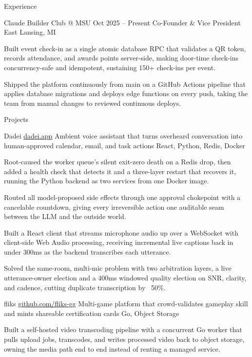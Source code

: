 \documentclass[
	11pt
]{../../../template}
\begin{document}
\begin{rSection}{E}{xperience}
		\begin{rSectionEntry}
			{Claude Builder Club @ MSU}
			{Oct 2025 -- Present}
			{Co-Founder \& Vice President}
			{}
			{East Lansing, MI}

			\item Built event check-in as a single atomic database RPC that validates a QR token, records attendance, and awards points server-side, making door-time check-ins concurrency-safe and idempotent, sustaining 150+ check-ins per event.
			\item Shipped the platform continuously from main on a GitHub Actions pipeline that applies database migrations and deploys edge functions on every push, taking the team from manual changes to reviewed continuous deploys.
		\end{rSectionEntry}
	\end{rSection}

	\begin{rSection}{P}{rojects}
		\begin{rSectionEntry}
			{Dadei}
			{\href{https://dadei.app}{dadei.app}}
			{Ambient voice assistant that turns overheard conversation into human-approved calendar, email, and task actions}
			{React, Python, Redis, Docker}
			{}

			\item Root-caused the worker queue's silent exit-zero death on a Redis drop, then added a health check that detects it and a three-layer restart that recovers it, running the Python backend as two services from one Docker image.
			\item Routed all model-proposed side effects through one approval chokepoint with a cancelable countdown, giving every irreversible action one auditable seam between the LLM and the outside world.
			\item Built a React client that streams microphone audio up over a WebSocket with client-side Web Audio processing, receiving incremental live captions back in under 300ms as the backend transcribes each utterance.
			\item Solved the same-room, multi-mic problem with two arbitration layers, a live utterance-owner election and a 400ms windowed quality election on SNR, clarity, and cadence, cutting duplicate transcription by ~50\%.
		\end{rSectionEntry}

		\begin{rSectionEntry}
			{fliks}
			{\href{https://github.com/fliks-gg}{github.com/fliks-gg}}
			{Multi-game platform that crowd-validates gameplay skill and mints shareable certification cards}
			{Go, Object Storage}
			{}

			\item Built a self-hosted video transcoding pipeline with a concurrent Go worker that pulls upload jobs, transcodes, and writes processed video back to object storage, owning the media path end to end instead of renting a managed service.
		\end{rSectionEntry}
	\end{rSection}
\end{document}

